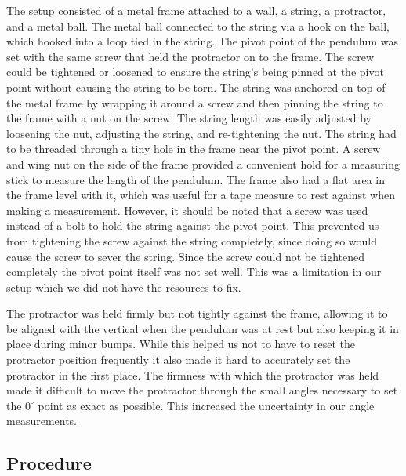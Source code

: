 \documentclass[iop,numberedappendix,appendixfloats]{emulateapj}
\def\deg{^{\circ}}
\begin{document}
The setup consisted of a metal frame attached to a wall, a string, a 
protractor, and a metal 
ball.  The metal ball connected to the string via a hook on the ball, which 
hooked into a loop tied in the string.  The pivot point of the pendulum was 
set with the same screw that held the protractor on to the frame.  The screw 
could be tightened or loosened to ensure the string's being pinned at the 
pivot point without causing the string to be torn.  The string was anchored 
on top of the metal frame by wrapping it around a screw and then pinning the 
string to the frame with a nut on the screw.  The string length was easily 
adjusted by loosening the nut, adjusting the string, and re-tightening the 
nut.  The string had to be threaded through a tiny hole in the frame near 
the pivot point. 
A screw and wing nut on the side of the frame provided a convenient hold 
for a measuring stick to measure the length of the pendulum.  The frame also 
had a flat area in the frame level with it, which was useful for a tape 
measure to rest against when making a measurement.  However, it should be 
noted that a screw was used instead of a bolt to hold the string against the 
pivot point.  This prevented us from tightening the screw against the string 
completely, since doing so would cause the screw to sever the string.  Since 
the screw could not be tightened completely the pivot point itself was not 
set well.  This was a limitation in our setup which we did not have the 
resources to fix.

The protractor was held firmly but not tightly against the frame, allowing it 
to be aligned with the vertical when the pendulum was at rest but also 
keeping it in place during minor bumps.  While this helped us not to have to 
reset the protractor position frequently it also made it hard to accurately 
set the protractor in the first place. The firmness with which the protractor 
was held made it difficult to move the protractor through the small angles 
necessary to set the $0\deg$ point as exact as possible.  This increased the 
uncertainty in our angle measurements.

\subsection{Procedure}
\end{document}
